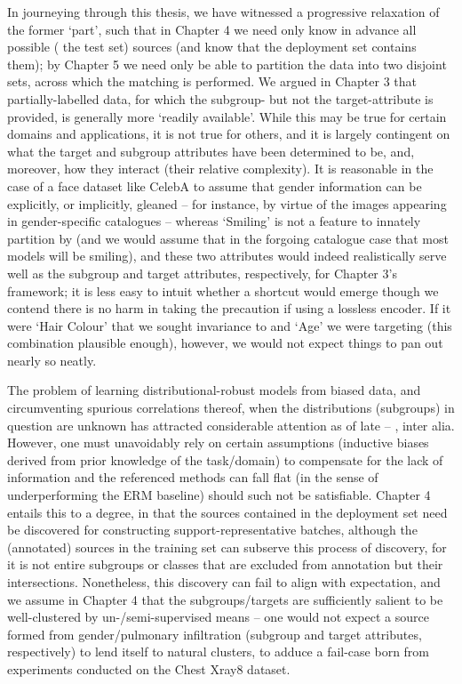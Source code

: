 %
In journeying through this thesis, we have witnessed a progressive relaxation of the former `part',
such that in Chapter 4 we need only know in advance all possible (\wrt{} the test set) sources (and
know that the deployment set contains them); by Chapter 5 we need only be able to partition the
data into two disjoint sets, across which the matching is performed.
%
We argued in Chapter 3 that partially-labelled data, for which the subgroup- but not the
target-attribute is provided, is generally more `readily available'. 
%
While this may be true for certain domains and applications, it is not true for others, and it is
largely contingent on what the target and subgroup attributes have been determined to be, and,
moreover, how they interact (their relative complexity).
%
It is reasonable in the case of a face dataset like CelebA to assume that gender information can be
explicitly, or implicitly, gleaned -- for instance, by virtue of the images appearing in
gender-specific catalogues -- whereas `Smiling' is not a feature to innately partition by (and we
would assume that in the forgoing catalogue case that most models will be smiling), and these two
attributes would indeed realistically serve well as the subgroup and target attributes,
respectively, for Chapter 3's framework; it is less easy to intuit whether a shortcut would emerge
though we contend there is no harm in taking the precaution if using a lossless encoder.
%
If it were `Hair Colour' that we sought invariance to and `Age' we were targeting (this combination
plausible enough), however, we would not expect things to pan out nearly so neatly.

%
The problem of learning distributional-robust models from biased data, and circumventing spurious
correlations thereof, when the distributions (subgroups) in question are unknown has attracted
considerable attention as of late --  \cite{HasSriNamLia18, SohDunAngGuetal20,
creager2021environment, liu2021just, pezeshki2021gradient, taghanaki2022masktune, kim2022learning},
inter alia.
%
However, one must unavoidably rely on certain assumptions (inductive biases derived from prior
knowledge of the task/domain) to compensate for the lack of information and the referenced methods
can fall flat (in the sense of underperforming the ERM baseline) should such not be satisfiable.
%
Chapter 4 entails this to a degree, in that the sources contained in the deployment set need be
discovered for constructing support-representative batches, although the (annotated) sources in the
training set can subserve this process of discovery, for it is not entire subgroups or classes that
are excluded from annotation but their intersections.
%
Nonetheless, this discovery can fail to align with expectation, and we assume in Chapter 4 that the
subgroups/targets are sufficiently salient to be well-clustered by un-/semi-supervised means -- one
would not expect a source formed from gender/pulmonary infiltration (subgroup and target
attributes, respectively) to lend itself to natural clusters, to adduce a fail-case born from
experiments conducted on the Chest Xray8 dataset. 

